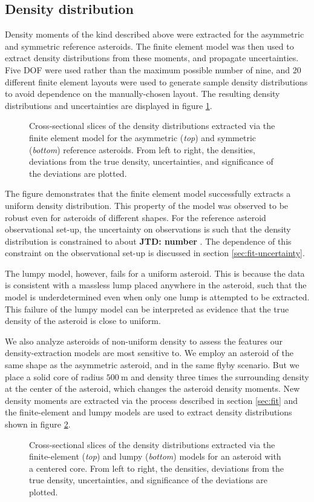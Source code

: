 \documentclass[fleqn,usenatbib]{mnras}
\newcommand{\jtd}[1]{ {\bf{\color{red} JTD: #1}} }
\begin{document}
\subsection{Density distribution}
\label{sec:asym-density}

Density moments of the kind described above were extracted for the asymmetric and symmetric reference asteroids. The finite element model was then used to extract density distributions from these moments, and propagate uncertainties. Five DOF were used rather than the maximum possible number of nine, and 20 different finite element layouts were used to generate sample density distributions to avoid dependence on the manually-chosen layout. The resulting density distributions and uncertainties are displayed in figure \ref{fig:uniform}.
\begin{figure}
  \caption{Cross-sectional slices of the density distributions extracted via the finite element model for the asymmetric (\textit{top}) and symmetric (\textit{bottom}) reference asteroids. From left to right, the densities, deviations from the true density, uncertainties, and significance of the deviations are plotted.}
  \label{fig:uniform}
\end{figure}

The figure demonstrates that the finite element model successfully extracts a uniform density distribution. This property of the model was observed to be robust even for asteroids of different shapes. For the reference asteroid observational set-up, the uncertainty on observations is such that the density distribution is constrained to about \jtd{number}. The dependence of this constraint on the observational set-up is discussed in section \ref{sec:fit-uncertainty}.

The lumpy model, however, fails for a uniform asteroid. This is because the data is consistent with a massless lump placed anywhere in the asteroid, such that the model is underdetermined even when only one lump is attempted to be extracted. This failure of the lumpy model can be interpreted as evidence that the true density of the asteroid is close to uniform.

We also analyze asteroids of non-uniform density to assess the features our density-extraction models are most sensitive to. We employ an asteroid of the same shape as the asymmetric asteroid, and in the same flyby scenario. But we place a solid core of radius $\SI{500}{\meter}$ and density three times the surrounding density at the center of the asteroid, which changes the asteroid density moments. New density moments are extracted via the process described in section \ref{sec:fit} and the finite-element and lumpy models are used to extract density distributions shown in figure \ref{fig:center-core}.
\begin{figure}
  \caption{Cross-sectional slices of the density distributions extracted via the finite-element (\textit{top}) and lumpy (\textit{bottom}) models for an asteroid with a centered core. From left to right, the densities, deviations from the true density, uncertainties, and significance of the deviations are plotted.}
  \label{fig:center-core}
\end{figure}
\end{document}
